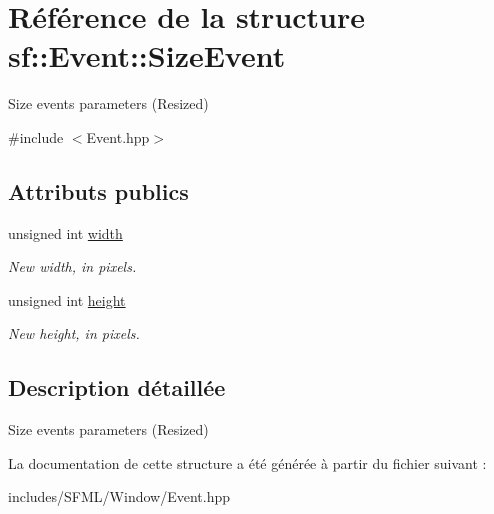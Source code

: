 \hypertarget{structsf_1_1Event_1_1SizeEvent}{}\section{Référence de la structure sf\+:\+:Event\+:\+:Size\+Event}
\label{structsf_1_1Event_1_1SizeEvent}


Size events parameters (Resized)  




{\ttfamily \#include $<$Event.\+hpp$>$}

\subsection*{Attributs publics}
\begin{DoxyCompactItemize}
\item 
\mbox{\label{structsf_1_1Event_1_1SizeEvent_a20ea1b78c9bb1604432f8f0067bbfd94}} 
unsigned int \hyperlink{structsf_1_1Event_1_1SizeEvent_a20ea1b78c9bb1604432f8f0067bbfd94}{width}
\begin{DoxyCompactList}\small\item\em New width, in pixels. \end{DoxyCompactList}\item 
\mbox{\label{structsf_1_1Event_1_1SizeEvent_af0f76a599d5f48189cb8d78d4e5facdb}} 
unsigned int \hyperlink{structsf_1_1Event_1_1SizeEvent_af0f76a599d5f48189cb8d78d4e5facdb}{height}
\begin{DoxyCompactList}\small\item\em New height, in pixels. \end{DoxyCompactList}\end{DoxyCompactItemize}


\subsection{Description détaillée}
Size events parameters (Resized) 

La documentation de cette structure a été générée à partir du fichier suivant \+:\begin{DoxyCompactItemize}
\item 
includes/\+S\+F\+M\+L/\+Window/Event.\+hpp\end{DoxyCompactItemize}
